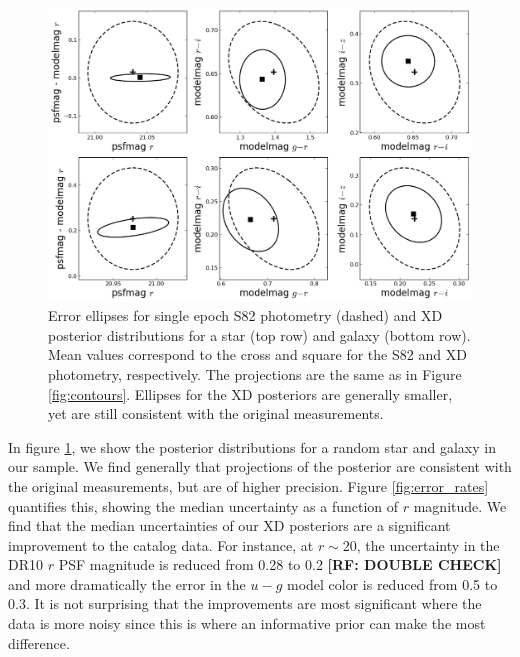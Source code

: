 \documentclass[12pt,preprint]{aastex}
\newcommand\rf[1]{{\bf [RF: #1]}}
\begin{document}
\begin{figure}
\centering
\includegraphics[width=16cm]{fig2.png}
\caption{Error ellipses for single epoch S82 photometry (dashed) and XD
posterior distributions for a star (top row) and galaxy (bottom row).  Mean
values correspond to the cross and square for the S82 and XD photometry, 
respectively.  The 
projections are the same as in Figure \ref{fig:contours}.  Ellipses for the XD
posteriors are generally smaller, yet are still consistent with the original 
measurements.
}
\label{fig:posteriors}
\end{figure}

In figure \ref{fig:posteriors}, we show the posterior distributions for a
random star and galaxy in our sample.  We find generally that projections of 
the posterior are consistent with the original measurements, but are of higher 
precision.  Figure \ref{fig:error_rates} quantifies this, showing the median 
uncertainty as a function of $r$ magnitude.  We find that the median
uncertainties of our XD posteriors are a significant improvement to the
catalog data.  For instance, at $r\sim20$, the uncertainty in the DR10 $r$ PSF 
magnitude is reduced from 0.28 to 0.2 \rf{DOUBLE CHECK} and more dramatically
the error in the $u-g$ model color is reduced from 0.5 to 0.3.  It is not
surprising that the improvements are most significant where the data is more 
noisy since this is where an informative prior can make the most difference.
\end{document}
